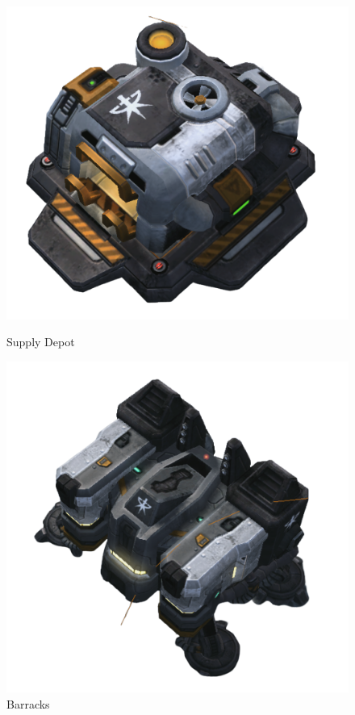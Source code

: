 \documentclass[12pt,a4paper]{article}
\begin{document}
\begin{figure}
    \includegraphics[width=\linewidth]{Figures/depot.png}
    \caption*{Supply Depot}\label{fig:depot}
    \endminipage\hfill
    \includegraphics[width=\linewidth]{Figures/barracks.png}
    \caption*{Barracks}\label{fig:barracks}

\end{figure}
\end{document}
